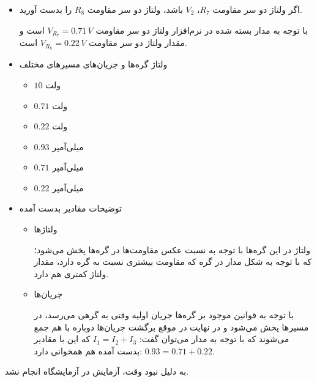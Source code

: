 \documentclass{article}
\begin{document}
				\begin{itemize}
					\item 
					اگر ولتاژ دو سر مقاومت $R_7$، $V_2$ باشد، ولتاژ دو سر مقاومت $R_8$ را بدست آورید.
					
					با توجه به مدار بسته شده در نرم‌افزار ولتاژ‌ دو سر مقاومت 
					$V_{R_7} = 0.71 \, V$
					است و مقدار ولتاژ دو سر مقاومت
					$V_{R_8} = 0.22 \, V$
					است.
					
					\item ولتاژ‌ گره‌ها و جریان‌های مسیر‌های مختلف
						\begin{itemize}
							\item {} $10$ ولت
							\item {} $0.71$ ولت
							\item {} $0.22$ ولت
							\item {} $0.93$ میلی‌آمپر
							\item {} $0.71$ میلی‌آمپر
							\item {} $0.22$ میلی‌آمپر
						\end{itemize}
					
					\item توضیحات مقادیر بدست آمده
						\begin{itemize}
							\item ولتاژ‌ها
							
								ولتاژ‌ در این گره‌ها با توجه به نسبت عکس مقاومت‌ها در گره‌ها پخش می‌شود؛ که با توجه به شکل مدار در گره  که مقاومت بیشتری نسبت به گره  دارد، مقدار ولتاژ‌ کمتری هم دارد.
							\item جریان‌ها
								
								با توجه به قوانین موجود بر گره‌‌ها جریان اولیه وقتی به گرهی می‌رسد، در مسیر‌ها پخش می‌شود و در نهایت در موقع برگشت جریان‌ها دوباره با هم جمع می‌شوند که با توجه به مدار می‌توان گفت:‌ $I_1 = I_2 + I_3$ که این با مقادیر بدست آمده هم همخوانی دارد: $0.93 = 0.71 + 0.22$.
								
						\end{itemize}
				\end{itemize}
				
				به دلیل نبود وقت، آزمایش در آزمایشگاه انجام نشد.
				
	\clearpage
\end{document}
